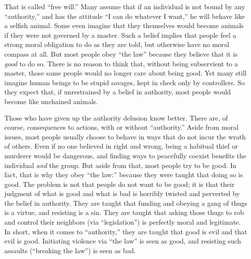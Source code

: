 \documentclass{book}
\begin{document}
That is called \enquote{free will.} Many assume that if an individual is not bound by any \enquote{authority,} and has the attitude \enquote{I can do whatever I want,} he will behave like a selfish animal. Some even imagine that they themselves would become animals if they were not governed by a master. Such a belief implies that people feel a strong moral obligation to do as they are told, but otherwise have no moral compass at all. But most people obey \enquote{the law} because they believe that it is \emph{good} to do so. There is no reason to think that, without being subservient to a master, those same people would no longer care about being good. Yet many still imagine human beings to be stupid savages, kept in check only by controllers. So they expect that, if unrestrained by a belief in authority, most people would become like unchained animals.

Those who have given up the authority delusion know better. There are, of course, consequences to actions, with or without \enquote{authority.} Aside from moral issues, most people usually choose to behave in ways that do not incur the wrath of others. Even if no one believed in right and wrong, being a habitual thief or murderer would be dangerous, and finding ways to peacefully coexist benefits the individual \emph{and} the group. But aside from that, most people try to be good. In fact, that is why they obey \enquote{the law:} because they were taught that doing so is good. The problem is not that people do not want to be good; it is that their judgment of what is good and what is bad is horribly twisted and perverted by the belief in authority. They are taught that funding and obeying a gang of thugs is a virtue, and resisting is a sin. They are taught that asking those thugs to rob and control their neighbors (via \enquote{legislation}) is perfectly moral and legitimate. In short, when it comes to \enquote{authority,} they are taught that good is evil and that evil is good. Initiating violence via \enquote{the law} is seen as good, and resisting such assaults (\enquote{breaking the law}) is seen as bad.
\end{document}
